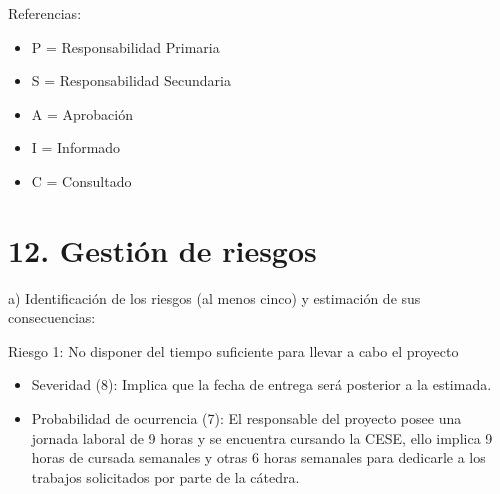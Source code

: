 \documentclass[11pt]{charter}
\begin{document}
\begin{table}[htpb]
\centering
{}
\end{table}

{\footnotesize
Referencias:
\begin{itemize}
	\item P = Responsabilidad Primaria
	\item S = Responsabilidad Secundaria
	\item A = Aprobación
	\item I = Informado
	\item C = Consultado
\end{itemize}
} %

\section{12. Gestión de riesgos}
\label{sec:riesgos}

a) Identificación de los riesgos (al menos cinco) y estimación de sus consecuencias:
 
Riesgo 1: No disponer del tiempo suficiente para llevar a cabo el proyecto
\begin{itemize}
\item Severidad (8): Implica que la fecha de entrega será posterior a la estimada.
\item Probabilidad de ocurrencia (7): El responsable del proyecto posee una jornada laboral de 9 horas y se encuentra cursando la CESE, ello implica 9 horas de cursada semanales y otras 6 horas semanales para dedicarle a los trabajos solicitados por parte de la cátedra. 
\end{itemize}   
\end{document}
